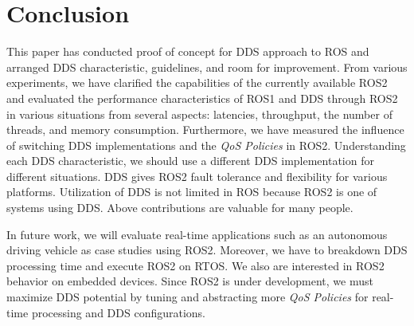 \documentclass{sig-alternate-05-2015}
\begin{document}
\vspace{-3mm}
\section{Conclusion}
\label{sec:orgheadline4}
This paper has conducted proof of concept for DDS approach to ROS and arranged DDS characteristic, guidelines, and room for improvement.
From various experiments, we have clarified the capabilities of the currently available ROS2 and evaluated the performance characteristics of ROS1 and DDS through ROS2 in various situations from several aspects: latencies, throughput, the number of threads, and memory consumption.
Furthermore, we have measured the influence of switching DDS implementations and the \emph{QoS Policies} in ROS2.
Understanding each DDS characteristic, we should use a different DDS implementation for different situations.
DDS gives ROS2 fault tolerance and flexibility for various platforms.
Utilization of DDS is not limited in ROS because ROS2 is one of systems using DDS.
Above contributions are valuable for many people.
\clearpage

In future work, we will evaluate real-time applications such as an autonomous driving vehicle \cite{kato2015open} as case studies using ROS2. 
Moreover, we have to breakdown DDS processing time and execute ROS2 on RTOS.
We also are interested in ROS2 behavior on embedded devices.
Since ROS2 is under development, we must maximize DDS potential by tuning and abstracting more \emph{QoS Policies} for real-time processing and DDS configurations.

\setlength{\baselineskip}{10.2pt}      %


\end{document}
